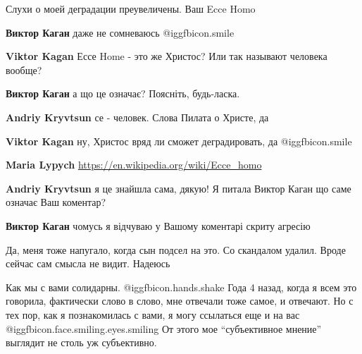  
 
 
 
 
\zzSecCmt

\begin{itemize} %

Слухи о моей деградации преувеличены. Ваш Ecce Homo

\begin{itemize} %
\textbf{Виктор Каган} даже не сомневаюсь  @igg{fbicon.smile} 

\textbf{Viktor Kagan} Ессе Home - это же Христос? Или так называют человека вообще?

\textbf{Виктор Каган} а що це означає? Поясніть, будь-ласка.

\textbf{Andriy Kryvtsun} се - человек. Слова Пилата о Христе, да

\textbf{Viktor Kagan} ну, Христос вряд ли сможет деградировать, да  @igg{fbicon.smile} 

\textbf{Maria Lypych} \url{https://en.wikipedia.org/wiki/Ecce_homo}

\textbf{Andriy Kryvtsun} я це знайшла сама, дякую!
Я питала Виктор Каган що саме означає Ваш коментар?

\textbf{Виктор Каган} чомусь я відчуваю у Вашому коментарі скриту агресію

\end{itemize} %


Да, меня тоже напугало, когда сын подсел на это. Со скандалом удалил. Вроде
сейчас сам смысла не видит. Надеюсь


Как мы с вами солидарны.  @igg{fbicon.hands.shake}  Года 4 назад, когда я всем это говорила, фактически
слово в слово, мне отвечали тоже самое, и отвечают. Но с тех пор, как я
познакомилась с вами, я могу ссылаться еще и на вас  @igg{fbicon.face.smiling.eyes.smiling}  От этого мое
\enquote{субъективное мнение} выглядит не столь уж субъективно.


\end{itemize}
